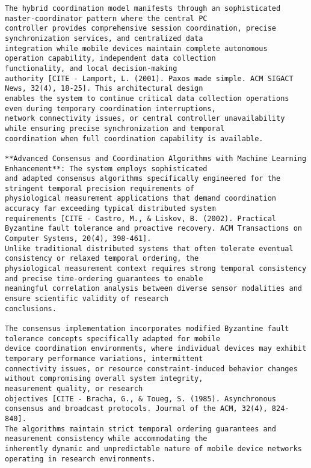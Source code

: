 \documentclass[11pt,a4paper]{report}
\begin{document}
\begin{verbatim}
The hybrid coordination model manifests through an sophisticated master-coordinator pattern where the central PC
controller provides comprehensive session coordination, precise synchronization services, and centralized data
integration while mobile devices maintain complete autonomous operation capability, independent data collection
functionality, and local decision-making
authority [CITE - Lamport, L. (2001). Paxos made simple. ACM SIGACT News, 32(4), 18-25]. This architectural design
enables the system to continue critical data collection operations even during temporary coordination interruptions,
network connectivity issues, or central controller unavailability while ensuring precise synchronization and temporal
coordination when full coordination capability is available.

**Advanced Consensus and Coordination Algorithms with Machine Learning Enhancement**: The system employs sophisticated
and adapted consensus algorithms specifically engineered for the stringent temporal precision requirements of
physiological measurement applications that demand coordination accuracy far exceeding typical distributed system
requirements [CITE - Castro, M., & Liskov, B. (2002). Practical Byzantine fault tolerance and proactive recovery. ACM Transactions on Computer Systems, 20(4), 398-461].
Unlike traditional distributed systems that often tolerate eventual consistency or relaxed temporal ordering, the
physiological measurement context requires strong temporal consistency and precise time-ordering guarantees to enable
meaningful correlation analysis between diverse sensor modalities and ensure scientific validity of research
conclusions.

The consensus implementation incorporates modified Byzantine fault tolerance concepts specifically adapted for mobile
device coordination environments, where individual devices may exhibit temporary performance variations, intermittent
connectivity issues, or resource constraint-induced behavior changes without compromising overall system integrity,
measurement quality, or research
objectives [CITE - Bracha, G., & Toueg, S. (1985). Asynchronous consensus and broadcast protocols. Journal of the ACM, 32(4), 824-840].
The algorithms maintain strict temporal ordering guarantees and measurement consistency while accommodating the
inherently dynamic and unpredictable nature of mobile device networks operating in research environments.


\end{verbatim}
\end{document}
